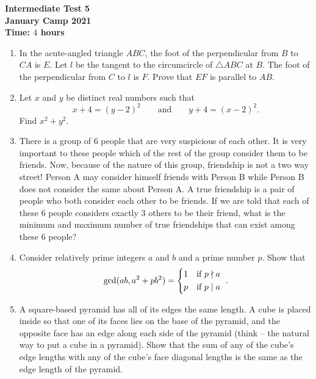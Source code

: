\documentclass{article}
\begin{document}
\thispagestyle{empty}

\begin{center}
  \textbf{\Large Intermediate Test 5}
  \\ \vspace{1em}
  \textbf{\large January Camp 2021}
  \\ \vspace{1em}
  \textbf{\large Time: $4$ hours}
\end{center}

\vspace{12pt}

\begin{enumerate}[1.]

\item %
In the acute-angled triangle $ABC$, the foot of the perpendicular from $B$ to $CA$ is $E$. Let $l$ be the tangent to the circumcircle of $\triangle ABC$ at $B$. The foot of the perpendicular from $C$ to $l$ is $F$. Prove that $EF$ is parallel to $AB$.


\item %
Let $x$ and $y$ be distinct real numbers such that $$x + 4 = (y - 2)^2 \qquad\text{and}\qquad y + 4 = (x - 2)^2.$$
Find $x^2 + y^2$.


\item %
There is a group of 6 people that are very suspicious of each other. It is very important to these people which of the rest of the group consider them to be friends. Now, because of the nature of this group, friendship is not a two way street! Person A may consider himself friends with Person B while Person B does not consider the same about Person A. A true friendship is a pair of people who both consider each other to be friends. If we are told that each of these 6 people considers exactly 3 others to be their friend, what is the minimum and maximum number of true friendships that can exist among these 6 people?


\item %
Consider relatively prime integers $a$ and $b$ and a prime number $p$.
Show that
\[ \gcd(ab, a^2+pb^2) = \begin{cases*} 1 & if $p \nmid a$ \\ p & if $p \mid a$ \end{cases*}. \]


\item %
A square-based pyramid has all of its edges the same length.
A cube is placed inside so that one of its faces lies on the base of the pyramid, and the opposite face has an edge along each side of the pyramid (think -- the natural way to put a cube in a pyramid).
Show that the sum of any of the cube's edge lengths with any of the cube's face diagonal lengths is the same as the edge length of the pyramid.



\end{enumerate}
\end{document}
